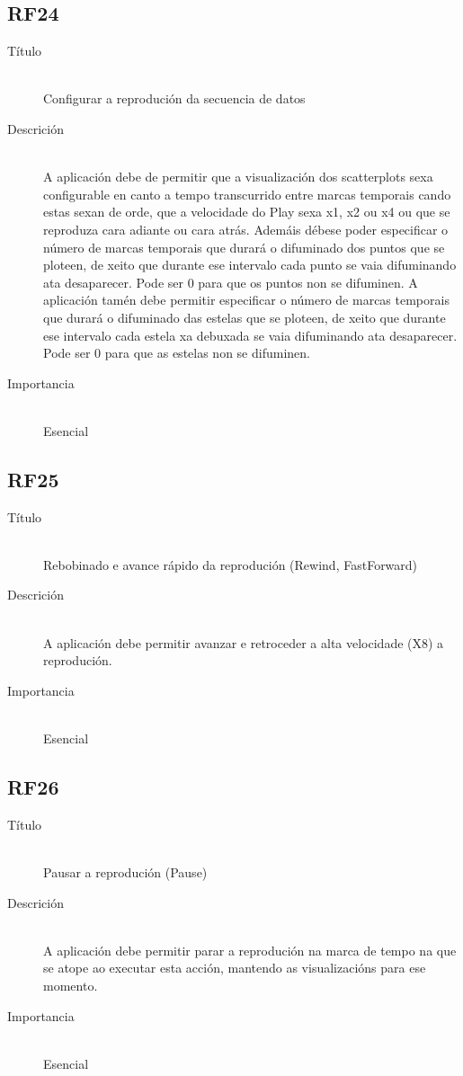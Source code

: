 \subsection*{RF24}
\begin{description}
\item[Título] \hfill \\
Configurar a reprodución da secuencia de datos
\item[Descrición] \hfill \\
A aplicación debe de permitir que a visualización dos scatterplots sexa configurable en canto a tempo transcurrido entre marcas temporais cando estas sexan de orde, que a velocidade do Play sexa x1, x2 ou x4 ou que se reproduza cara adiante ou cara atrás. Ademáis débese poder especificar o número de marcas temporais que durará o difuminado dos puntos que se ploteen, de xeito que durante ese intervalo cada punto se vaia difuminando ata desaparecer. Pode ser  0 para que os puntos non se difuminen. A aplicación tamén debe permitir especificar o número de marcas temporais que durará o difuminado das estelas que se ploteen, de xeito que durante ese intervalo cada estela xa debuxada se vaia difuminando ata desaparecer. Pode ser 0 para que as estelas non se difuminen.
\item[Importancia] \hfill \\
Esencial
\end{description}

\subsection*{RF25}
\begin{description}
\item[Título] \hfill \\
Rebobinado e avance rápido da reprodución (Rewind, FastForward)
\item[Descrición] \hfill \\
A aplicación debe permitir avanzar e retroceder a alta velocidade (X8) a reprodución.
\item[Importancia] \hfill \\
Esencial
\end{description}

\subsection*{RF26}
\begin{description}
\item[Título] \hfill \\
Pausar a reprodución (Pause)
\item[Descrición] \hfill \\
A aplicación debe permitir parar a reprodución na marca de tempo na que se atope ao executar esta acción, mantendo as visualizacións para ese momento.
\item[Importancia] \hfill \\
Esencial
\end{description}


